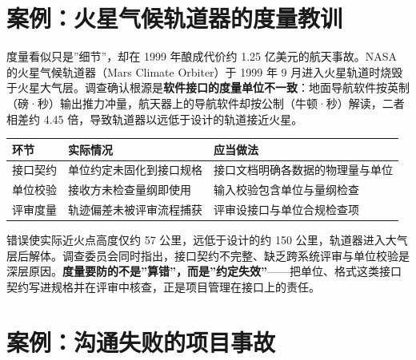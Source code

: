 \documentclass[
]{ctexbook}
\newcounter{none}
\begin{document}
\section{案例：火星气候轨道器的度量教训}\label{ux6848ux4f8bux706bux661fux6c14ux5019ux8f68ux9053ux5668ux7684ux5ea6ux91cfux6559ux8bad}

度量看似只是''细节''，却在 1999 年酿成代价约 1.25 亿美元的航天事故。NASA
的火星气候轨道器（Mars Climate Orbiter）于 1999 年 9
月进入火星轨道时烧毁于火星大气层。调查确认根源是\textbf{软件接口的度量单位不一致}：地面导航软件按英制（磅·秒）输出推力冲量，航天器上的导航软件却按公制（牛顿·秒）解读，二者相差约
4.45 倍，导致轨道器以远低于设计的轨道接近火星。

{\def\LTcaptype{none} %
\begin{longtable}[]{@{}
  >{\raggedright\arraybackslash}p{}
  >{\raggedright\arraybackslash}p{}
  >{\raggedright\arraybackslash}p{}@{}}
\toprule\noalign{}
\begin{minipage}[b]{\linewidth}\raggedright
环节
\end{minipage} & \begin{minipage}[b]{\linewidth}\raggedright
实际情况
\end{minipage} & \begin{minipage}[b]{\linewidth}\raggedright
应当做法
\end{minipage} \\
\midrule\noalign{}
\endhead
\bottomrule\noalign{}
\endlastfoot
接口契约 & 单位约定未固化到接口规格 &
接口文档明确各数据的物理量与单位 \\
单位校验 & 接收方未检查量纲即使用 & 输入校验包含单位与量纲检查 \\
评审度量 & 轨迹偏差未被评审流程捕获 & 评审设接口与单位合规检查项 \\
\end{longtable}
}

错误使实际近火点高度仅约 57 公里，远低于设计的约 150
公里，轨道器进入大气层后解体。调查委员会同时指出，接口契约不完整、缺乏跨系统评审与单位校验是深层原因。\textbf{度量要防的不是''算错''，而是''约定失效''}------把单位、格式这类接口契约写进规格并在评审中核查，正是项目管理在接口上的责任。

\section{案例：沟通失败的项目事故}\label{ux6848ux4f8bux6c9fux901aux5931ux8d25ux7684ux9879ux76eeux4e8bux6545}
\end{document}
